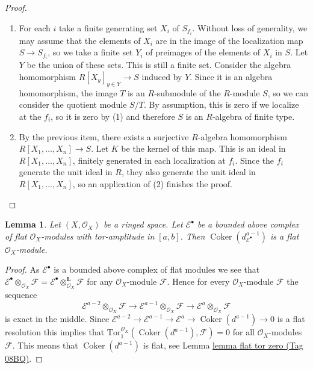 \documentclass{amsart}
\theoremstyle{plain}
\newtheorem{lemma}[subsection]{Lemma}
\theoremstyle{definition}
\theoremstyle{remark}
\numberwithin{equation}{subsection}
\def\Coker{\mathop{\mathrm{Coker}}}
\begin{document}
\begin{proof}
\begin{enumerate}
each $I_{f_i} \subset R_{f_i}$ is an ideal. These are all
finitely generated by assumption, so we conclude by (2).
\item For each $i$ take a finite generating set $X_i$ of $S_{f_i}$.
Without loss of generality, we may assume that the elements of $X_i$
are in the image of the localization map $S \rightarrow S_{f_i}$, so
we take a finite set $Y_i$ of preimages of the elements of $X_i$ in
$S$. Let $Y$ be the union of these sets. This is still a finite set.
Consider the algebra homomorphism $R[X_y]_{y \in Y} \rightarrow S$
induced by $Y$. Since it is an algebra homomorphism, the image $T$
is an $R$-submodule of the $R$-module $S$, so we can consider the
quotient module $S/T$. By assumption, this is zero if we localize
at the $f_i$, so it is zero by (1) and therefore $S$ is an
$R$-algebra of finite type.
\item By the previous item, there exists a surjective $R$-algebra
homomorphism $R[X_1, \ldots, X_n] \rightarrow S$. Let $K$ be the kernel
of this map. This is an ideal in $R[X_1, \ldots, X_n]$, finitely generated
in each localization at $f_i$. Since the $f_i$ generate the unit ideal
in $R$, they also generate the unit ideal in $R[X_1, \ldots, X_n]$, so an
application of (2) finishes the proof.
\end{enumerate}
\end{proof}


\begin{lemma}
\label{cohomology-lemma-last-one-flat}
Let $(X, \mathcal{O}_X)$ be a ringed space.
Let $\mathcal{E}^\bullet$ be a bounded above complex of flat
$\mathcal{O}_X$-modules with tor-amplitude in $[a, b]$.
Then $\Coker(d_{\mathcal{E}^\bullet}^{a - 1})$ is a flat
$\mathcal{O}_X$-module.
\end{lemma}

\begin{proof}
As $\mathcal{E}^\bullet$ is a bounded above complex of flat modules we see that
$\mathcal{E}^\bullet \otimes_{\mathcal{O}_X} \mathcal{F} =
\mathcal{E}^\bullet \otimes_{\mathcal{O}_X}^{\mathbf{L}} \mathcal{F}$
for any $\mathcal{O}_X$-module $\mathcal{F}$.
Hence for every $\mathcal{O}_X$-module $\mathcal{F}$ the sequence
$$
\mathcal{E}^{a - 2} \otimes_{\mathcal{O}_X} \mathcal{F} \to
\mathcal{E}^{a - 1} \otimes_{\mathcal{O}_X} \mathcal{F} \to
\mathcal{E}^a \otimes_{\mathcal{O}_X} \mathcal{F}
$$
is exact in the middle. Since
$\mathcal{E}^{a - 2} \to \mathcal{E}^{a - 1} \to \mathcal{E}^a \to
\Coker(d^{a - 1}) \to 0$
is a flat resolution this implies that
$\text{Tor}_1^{\mathcal{O}_X}(\Coker(d^{a - 1}), \mathcal{F}) = 0$
for all $\mathcal{O}_X$-modules $\mathcal{F}$. This means that
$\Coker(d^{a - 1})$ is flat, see Lemma \href{https://stacks.math.columbia.edu/tag/08BQ}{lemma flat tor zero (Tag 08BQ)}.
\end{proof}
\end{document}
